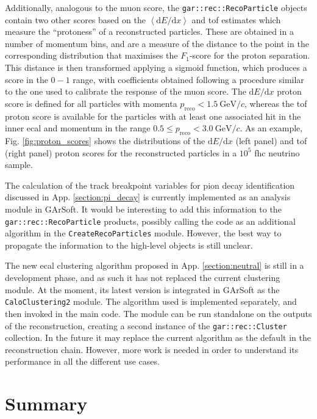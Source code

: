Additionally, analogous to the muon score, the \texttt{gar::rec::RecoParticle} objects contain two other scores based on the $\left<\mathrm{d}E/\mathrm{d}x\right>$ and \gls{tof} estimates which measure the ``protoness'' of a reconstructed particles. These are obtained in a number of momentum bins, and are a measure of the distance to the point in the corresponding distribution that maximises the $F_{1}$-score for the proton separation. This distance is then transformed applying a sigmoid function, which produces a score in the $0-1$ range, with coefficients obtained following a procedure similar to the one used to calibrate the response of the muon score. The $\mathrm{d}E/\mathrm{d}x$ proton score is defined for all particles with momenta $p_{\mathrm{reco}} < 1.5~\mathrm{GeV}/c$, whereas the \gls{tof} proton score is available for the particles with at least one associated hit in the inner \gls{ecal} and momentum in the range $0.5 \leq p_{\mathrm{reco}} < 3.0~\mathrm{GeV}/c$. As an example, Fig. \ref{fig:proton_scores} shows the distributions of the $\mathrm{d}E/\mathrm{d}x$ (left panel) and \gls{tof} (right panel) proton scores for the reconstructed particles in a $10^{5}$ \gls{fhc} neutrino sample.

The calculation of the track breakpoint variables for pion decay identification discussed in App. \ref{section:pi_decay} is currently implemented as an analysis module in GArSoft. It would be interesting to add this information to the \texttt{gar::rec::RecoParticle} products, possibly calling the code as an additional algorithm in the \texttt{CreateRecoParticles} module. However, the best way to propagate the information to the high-level objects is still unclear.

The new \gls{ecal} clustering algorithm proposed in App. \ref{section:neutral} is still in a development phase, and as such it has not replaced the current clustering module. At the moment, its latest version is integrated in GArSoft as the \texttt{CaloClustering2} module. The algorithm used is implemented separately, and then invoked in the main code. The module can be run standalone on the outputs of the reconstruction, creating a second instance of the \texttt{gar::rec::Cluster} collection. In the future it may replace the current algorithm as the default in the reconstruction chain. However, more work is needed in order to understand its performance in all the different use cases.

\section{Summary}

